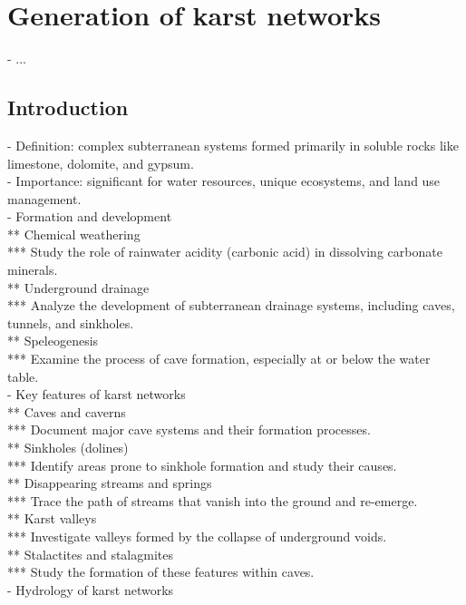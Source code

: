 \graphicspath{{"./Chapter 2/Figures/"}}

\chapter{Generation of karst networks}
\label{chap:karsts}
\minitoc

- ...

\section{Introduction}
\label{sec:karst_introduction}
- Definition: complex subterranean systems formed primarily in soluble rocks like limestone, dolomite, and gypsum. \\
- Importance: significant for water resources, unique ecosystems, and land use management. \\
- Formation and development \\
** Chemical weathering \\
*** Study the role of rainwater acidity (carbonic acid) in dissolving carbonate minerals. \\
** Underground drainage \\
*** Analyze the development of subterranean drainage systems, including caves, tunnels, and sinkholes. \\
** Speleogenesis \\
*** Examine the process of cave formation, especially at or below the water table. \\
- Key features of karst networks \\
** Caves and caverns \\
*** Document major cave systems and their formation processes. \\
** Sinkholes (dolines) \\
*** Identify areas prone to sinkhole formation and study their causes. \\
** Disappearing streams and springs \\
*** Trace the path of streams that vanish into the ground and re-emerge. \\
** Karst valleys \\
*** Investigate valleys formed by the collapse of underground voids. \\
** Stalactites and stalagmites \\
*** Study the formation of these features within caves. \\
- Hydrology of karst networks \\
